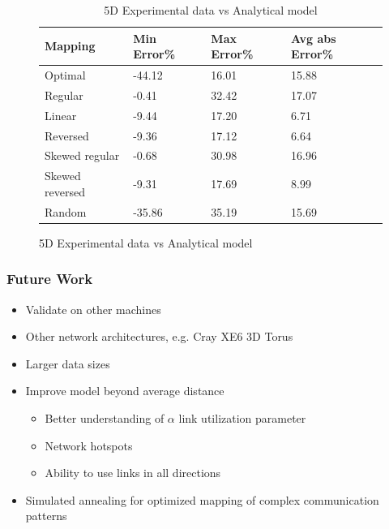 \documentclass{beamer}
\begin{document}
\begin{frame}[fragile]
\begin{figure}
\caption{Analytical model effectiveness}
\begin{table}
  \caption{5D Experimental data vs Analytical model
    \label{table:data vs model 5d}}
  {\footnotesize
    \begin{tabular}{ | l | l | l | p{1.5cm} |}
    \hline
    Mapping         &    Min Error\% &   Max Error\% & Avg abs Error\%\\ \hline
    Optimal         &         -44.12 & 16.01 & 15.88\\ \hline
    Regular         &         -0.41  & 32.42 & 17.07\\ \hline
    Linear          &         -9.44  & 17.20 & 6.71\\ \hline
    Reversed        &         -9.36  & 17.12 & 6.64\\ \hline
    Skewed regular  &         -0.68  & 30.98 & 16.96\\ \hline
    Skewed reversed &         -9.31  & 17.69 & 8.99\\ \hline
    Random          &         -35.86 & 35.19 & 15.69\\ \hline
    \hline
    \end{tabular}
  }
\end{table}

\end{figure}
\end{frame}

\begin{frame}
\frametitle{Future Work}
\begin{itemize}
  \item Validate on other machines
  \item Other network architectures, e.g. Cray XE6 3D Torus
  \item Larger data sizes
  \item Improve model beyond average distance
  \begin{itemize}
    \item Better understanding of $\alpha$ link utilization parameter
    \item Network hotspots
    \item Ability to use links in all directions
  \end{itemize}
  \item Simulated annealing for optimized mapping of complex communication patterns
\end{itemize}
\end{frame}
\end{document}
